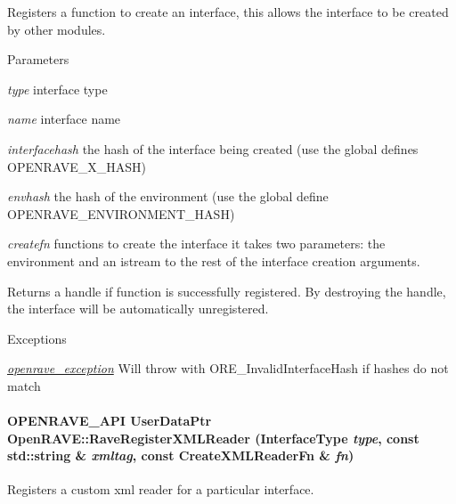 Registers a function to create an interface, this allows the interface to be created by other modules. 


\begin{DoxyParams}{Parameters}
\item[{\em type}]interface type \item[{\em name}]interface name \item[{\em interfacehash}]the hash of the interface being created (use the global defines OPENRAVE\_\-X\_\-HASH) \item[{\em envhash}]the hash of the environment (use the global define OPENRAVE\_\-ENVIRONMENT\_\-HASH) \item[{\em createfn}]functions to create the interface it takes two parameters: the environment and an istream to the rest of the interface creation arguments. \end{DoxyParams}
\begin{DoxyReturn}{Returns}
a handle if function is successfully registered. By destroying the handle, the interface will be automatically unregistered. 
\end{DoxyReturn}

\begin{DoxyExceptions}{Exceptions}
\item[{\em \hyperlink{classOpenRAVE_1_1openrave__exception}{openrave\_\-exception}}]Will throw with ORE\_\-InvalidInterfaceHash if hashes do not match \end{DoxyExceptions}
\hypertarget{namespaceOpenRAVE_a255c808782af449015333e7e230bf3b8}{
\paragraph[{RaveRegisterXMLReader}]{\setlength{\rightskip}{0pt plus 5cm}OPENRAVE\_\-API UserDataPtr OpenRAVE::RaveRegisterXMLReader (InterfaceType {\em type}, \/  const std::string \& {\em xmltag}, \/  const CreateXMLReaderFn \& {\em fn})}\hfill}
\label{namespaceOpenRAVE_a255c808782af449015333e7e230bf3b8}


Registers a custom xml reader for a particular interface. 

